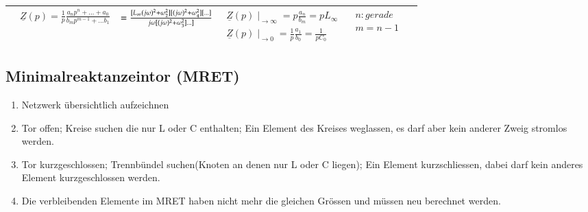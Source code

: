\begin{tabular}{| c | c | c c | c | c |}
{			}
			& $ \underline{Z}(p)=\frac{1}{p} \frac{a_np^{n}+ \ldots +a_0}{b_mp^{m-1}+ \ldots b_1}$
			& $ = \frac{[L_{\infty}(j \omega)^2 + \omega_2^2][(j \omega)^2 +
				\omega_4^2][\ldots]} 
				{j \omega[(j \omega)^2 + \omega_3^2]\ldots]}$
			& $ \begin{matrix}
					\underline{Z}(p)\mid_{\rightarrow\infty}=p\frac{a_n}{b_m}=pL_{\infty}\\
					\underline{Z}(p)\mid_{\rightarrow 0}=\frac{1}{p}\frac{a_1}{b_0}=\frac{1}{pC_{0}}
				\end{matrix}$
			& $ \begin{matrix}
               		n: gerade\\
               		m=n-1
                \end{matrix}$\\
		\hline
	\end{tabular}
	\renewcommand{\arraystretch}{1}
\newpage		
		
\subsection{Minimalreaktanzeintor (MRET)}
	\begin{enumerate}{\setlength{\itemsep}{0cm}\setlength{\parsep}{0cm} \setlength{\topsep}{0cm}}
      \item Netzwerk übersichtlich aufzeichnen 
      \item Tor offen; Kreise suchen die nur L oder C enthalten; Ein
      Element des Kreises weglassen, es darf aber kein anderer Zweig stromlos werden. 
      \item Tor kurzgeschlossen; Trennbündel suchen(Knoten an denen nur
      L oder C liegen); Ein Element kurzschliessen, dabei darf kein anderes Element kurzgeschlossen werden.
      \item Die verbleibenden Elemente im MRET haben nicht mehr die
      gleichen Grössen und müssen neu berechnet werden.
    \end{enumerate}
	
		
			
